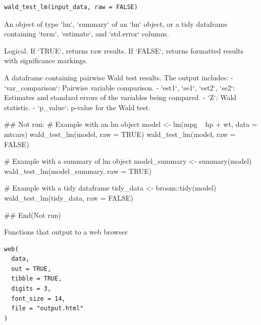 \documentclass[a4paper]{book}
\begin{document}
%
\begin{Usage}
\begin{verbatim}
wald_test_lm(input_data, raw = FALSE)
\end{verbatim}
\end{Usage}
%
\begin{Arguments}
\begin{ldescription}
\item[\code{input\_data}] An object of type `lm`, `summary` of an `lm` object, or a tidy dataframe
containing `term`, `estimate`, and `std.error` columns.

\item[\code{raw}] Logical. If `TRUE`, returns raw results. If `FALSE`, returns formatted results with significance markings.
\end{ldescription}
\end{Arguments}
%
\begin{Value}
A dataframe containing pairwise Wald test results. The output includes:
- `var\_comparison`: Pairwise variable comparison.
- `est1`, `se1`, `est2`, `se2`: Estimates and standard errors of the variables being compared.
- `Z`: Wald statistic.
- `p\_value`: p-value for the Wald test.
\end{Value}
%
\begin{Examples}
\begin{ExampleCode}

\#\# Not run: 
# Example with an lm object
model <- lm(mpg ~ hp + wt, data = mtcars)
wald_test_lm(model, raw = TRUE)
wald_test_lm(model, raw = FALSE)

# Example with a summary of lm object
model_summary <- summary(model)
wald_test_lm(model_summary, raw = TRUE)

# Example with a tidy dataframe
tidy_data <- broom::tidy(model)
wald_test_lm(tidy_data, raw = FALSE)

## End(Not run)
\end{ExampleCode}
\end{Examples}
%
\begin{Description}
Functions that output to a web browser
\end{Description}
%
\begin{Usage}
\begin{verbatim}
web(
  data,
  out = TRUE,
  tibble = TRUE,
  digits = 3,
  font_size = 14,
  file = "output.html"
)
\end{verbatim}
\end{Usage}
\end{document}
